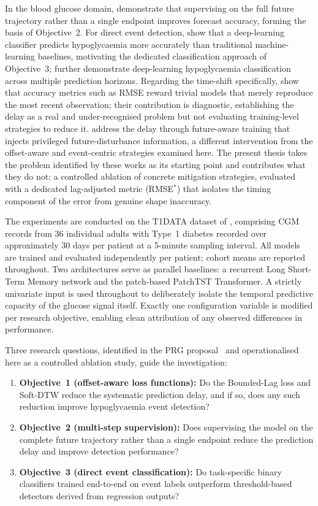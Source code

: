 In the blood glucose domain, \citet{fox2018multioutput} demonstrate that supervising on the full future trajectory rather than a single endpoint improves forecast accuracy, forming the basis of Objective~2. For direct event detection, \citet{shao2024hypoglycemia} show that a deep-learning classifier predicts hypoglycaemia more accurately than traditional machine-learning baselines, motivating the dedicated classification approach of Objective~3; \citet{cinar2025hypoclassification} further demonstrate deep-learning hypoglycaemia classification across multiple prediction horizons. Regarding the time-shift specifically, \citet{wolff2025cgpm} show that accuracy metrics such as RMSE reward trivial models that merely reproduce the most recent observation; their contribution is diagnostic, establishing the delay as a real and under-recognised problem but not evaluating training-level strategies to reduce it. \citet{sun2026futureaware} address the delay through future-aware training that injects privileged future-disturbance information, a different intervention from the offset-aware and event-centric strategies examined here. The present thesis takes the problem identified by these works as its starting point and contributes what they do not: a controlled ablation of concrete mitigation strategies, evaluated with a dedicated lag-adjusted metric (RMSE$^*$) that isolates the timing component of the error from genuine shape inaccuracy.

The experiments are conducted on the T1DATA dataset of \citet{garciatirado2023t1d}, comprising CGM records from 36 individual adults with Type~1 diabetes recorded over approximately 30 days per patient at a 5-minute sampling interval. All models are trained and evaluated independently per patient; cohort means are reported throughout. Two architectures serve as parallel baselines: a recurrent Long Short-Term Memory network and the patch-based PatchTST Transformer. A strictly univariate input is used throughout to deliberately isolate the temporal predictive capacity of the glucose signal itself. Exactly one configuration variable is modified per research objective, enabling clean attribution of any observed differences in performance.

Three research questions, identified in the PRG proposal~\citep{prg_glucose_proposal} and operationalised here as a controlled ablation study, guide the investigation:

\begin{enumerate}
    \item \textbf{Objective~1 (offset-aware loss functions):} Do the Bounded-Lag loss and Soft-DTW reduce the systematic prediction delay, and if so, does any such reduction improve hypoglycaemia event detection?
    \item \textbf{Objective~2 (multi-step supervision):} Does supervising the model on the complete future trajectory rather than a single endpoint reduce the prediction delay and improve detection performance?
    \item \textbf{Objective~3 (direct event classification):} Do task-specific binary classifiers trained end-to-end on event labels outperform threshold-based detectors derived from regression outputs?
\end{enumerate}

